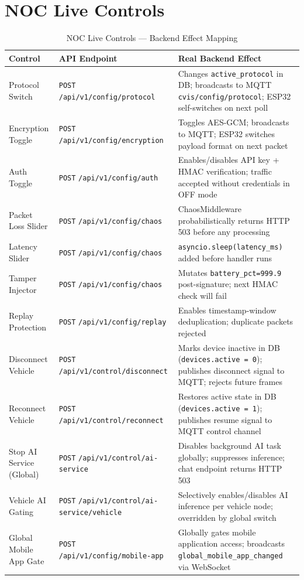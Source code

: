 \documentclass[12pt,a4paper]{report}
\begin{document}
\section{NOC Live Controls}

{\small
\begin{table}[H]
\centering
\caption{NOC Live Controls — Backend Effect Mapping}
\label{tab:controls}
\begin{tabularx}{\textwidth}{L{3.2cm} L{4.4cm} X}
\toprule
\textbf{Control} & \textbf{API Endpoint} & \textbf{Real Backend Effect} \\
\midrule
Protocol Switch & \texttt{POST} \nolinkurl{/api/v1/config/protocol} & Changes \texttt{active\_protocol} in DB; broadcasts to MQTT \texttt{cvis/config/protocol}; ESP32 self-switches on next poll \\
Encryption Toggle & \texttt{POST} \nolinkurl{/api/v1/config/encryption} & Toggles AES-GCM; broadcasts to MQTT; ESP32 switches payload format on next packet \\
Auth Toggle & \texttt{POST} \nolinkurl{/api/v1/config/auth} & Enables/disables API key + HMAC verification; traffic accepted without credentials in OFF mode \\
Packet Loss Slider & \texttt{POST} \nolinkurl{/api/v1/config/chaos} & ChaosMiddleware probabilistically returns HTTP 503 before any processing \\
Latency Slider & \texttt{POST} \nolinkurl{/api/v1/config/chaos} & \texttt{asyncio.sleep(latency\_ms)} added before handler runs \\
Tamper Injector & \texttt{POST} \nolinkurl{/api/v1/config/chaos} & Mutates \texttt{battery\_pct=999.9} post-signature; next HMAC check will fail \\
Replay Protection & \texttt{POST} \nolinkurl{/api/v1/config/replay} & Enables timestamp-window deduplication; duplicate packets rejected \\
Disconnect Vehicle & \texttt{POST} \nolinkurl{/api/v1/control/disconnect} & Marks device inactive in DB (\texttt{devices.active = 0}); publishes disconnect signal to MQTT; rejects future frames \\
Reconnect Vehicle & \texttt{POST} \nolinkurl{/api/v1/control/reconnect} & Restores active state in DB (\texttt{devices.active = 1}); publishes resume signal to MQTT control channel \\
Stop AI Service (Global) & \texttt{POST} \nolinkurl{/api/v1/control/ai-service} & Disables background AI task globally; suppresses inference; chat endpoint returns HTTP 503 \\
Vehicle AI Gating & \texttt{POST} \nolinkurl{/api/v1/control/ai-service/vehicle} & Selectively enables/disables AI inference per vehicle node; overridden by global switch \\
Global Mobile App Gate & \texttt{POST} \nolinkurl{/api/v1/config/mobile-app} & Globally gates mobile application access; broadcasts \texttt{global\_mobile\_app\_changed} via WebSocket \\
\bottomrule
\end{tabularx}
\end{table}
}
\end{document}
